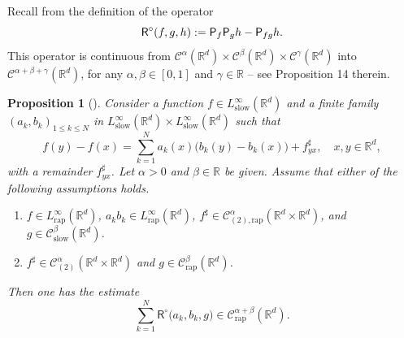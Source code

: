 \documentclass[11pt]{article}
\numberwithin{equation}{section}
\newenvironment{enumeratea}
{\bgroup\def\theenumi{\alph{enumi}}\begin{enumerate}}
{\end{enumerate}\egroup}
\theoremstyle{plain}
\newtheorem{prop}[thm]{Proposition}
\theoremstyle{definition}
\newcommand{\rap}{\mathrm{rap}}
\newcommand{\slow}{\mathrm{slow}}
\newcommand{\sfR}{\mathsf{R}}
\newcommand{\bbR}{\mathbb{R}}
\newcommand{\mcC}{\mathcal{C}}
\begin{document}
Recall from \cite{BB16} the definition of the operator
\[
{\sfR}^\circ(f,g,h) := {\sf P}_f{\sf P}_gh - {\sf P}_{fg}h.
\]
This operator is continuous from $\mcC^\alpha(\bbR^d)\times \mcC^\beta(\bbR^d)\times \mcC^\gamma(\bbR^d)$ into $\mcC^{\alpha+\beta+\gamma}(\bbR^d)$, for any $\alpha,\beta\in[0,1]$ and $\gamma\in\bbR$ -- see Proposition 14 therein.

\begin{prop}[{\cite[Prop.\,10]{BH}}]
\label{prop:sum of R}
Consider a function $f\in L_\slow^\infty(\bbR^d)$ and a finite family $(a_k,b_k)_{1\le k\le N}$ in $L_\slow^\infty(\bbR^d)\times L_\slow^\infty(\bbR^d)$ such that
\[
f(y)-f(x) = \sum_{k=1}^N a_k(x)\bigl(b_k(y)-b_k(x)\bigr) + f_{yx}^\sharp,\quad x,y\in\bbR^d,
\]
with a remainder $f_{yx}^\sharp$.
Let $\alpha>0$ and $\beta\in\bbR$ be given. Assume that either of the following assumptions holds.
\begin{enumeratea}
\item\label{prop:sum of Ra} $f\in L_\rap^\infty(\bbR^d)$, $a_kb_k\in L_\rap^\infty(\bbR^d)$, $f^\sharp\in\mcC_{(2),\rap}^\alpha(\bbR^d\times\bbR^d)$, and $g\in \mcC_\slow^\beta(\bbR^d)$.
\item\label{prop:sum of Rb} $f^\sharp\in\mcC_{(2)}^\alpha(\bbR^d\times\bbR^d)$ and $g\in \mcC_\rap^\beta(\bbR^d)$.
\end{enumeratea}
Then one has the estimate
\[
\sum_{k=1}^N {\sfR}^\circ\bigl(a_k,b_k,g\bigr)\in \mcC_\rap^{\alpha+\beta}(\bbR^d).
\]
\end{prop}
\end{document}
